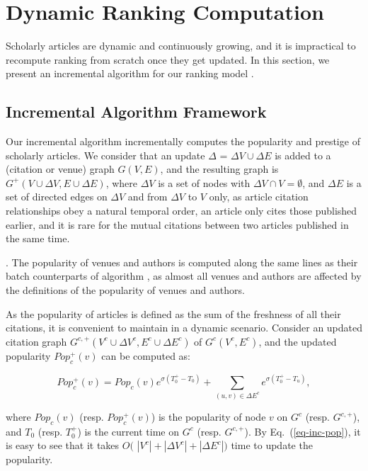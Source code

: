 \section{Dynamic Ranking Computation}
\label{sec-incAlg}

Scholarly articles are dynamic and continuously growing, and it is impractical to recompute ranking from scratch once they get updated. In this section, we present an incremental algorithm for our ranking model \ensemblerank.


\subsection{Incremental Algorithm Framework}
\label{subsec-inc-alg}




Our incremental algorithm \incensemble incrementally computes the popularity and prestige of scholarly articles.
We consider that an update $\Delta$ = $\Delta V\cup\Delta E$ is added to a   (citation or venue) graph $G(V, E)$,
and the resulting graph is $G^+(V\cup\Delta V, E\cup\Delta E)$, where
$\Delta V$ is a set of nodes with $\Delta V\cap V = \emptyset$, and $\Delta E$ is a set of directed edges on $\Delta V$ and from $\Delta V$ to $V$ only, as article citation relationships obey a natural temporal order, \ie an article only cites those published earlier, and it is rare for the mutual citations between two articles published in the same time.


.
The popularity of venues and authors is computed along the same lines as their batch counterparts of algorithm \batensemble,
as almost all venues and authors are affected  by the definitions of the popularity of venues and authors.


As the popularity of articles is defined as the sum of the freshness of all their citations, it is convenient to maintain in a dynamic scenario. Consider an updated citation graph $G^{c,+}(V^c\cup\Delta V^c, E^c\cup\Delta E^c)$ of $G^c(V^c, E^c)$, and the updated popularity $Pop_{c}^+(v)$ can be computed as:

\vspace{-1ex}
\begin{small}
\begin{equation}\label{eq-inc-pop}
Pop_c^+(v) = Pop_c(v) {e^{\sigma (T^+_0-T_0)}} + \sum_{(u,v)\in \Delta E^c} {e^{\sigma (T^+_0-T_u)}},
\end{equation}
\end{small}
%
\noindent where $Pop_c(v)$ (resp. $Pop_c^+(v)$) is the popularity of node $v$ on $G^c$ (resp. $G^{c,+}$), and
$T_0$ (resp. $T^+_0$) is the current time on $G^c$ (resp. $G^{c,+}$).
%
By Eq.~(\ref{eq-inc-pop}), it is easy to see that it takes $O($ $|V^c|+|\Delta V^c|+|\Delta E^c|)$ time to update the popularity.




